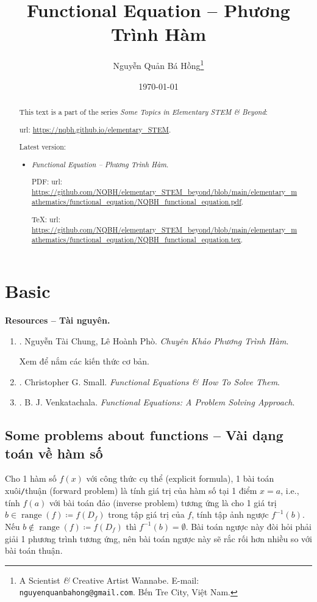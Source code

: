 \documentclass{article}
\title{Functional Equation -- Phương Trình Hàm}
\author{Nguyễn Quản Bá Hồng\footnote{A Scientist {\it\&} Creative Artist Wannabe. E-mail: {\tt nguyenquanbahong@gmail.com}. Bến Tre City, Việt Nam.}}
\date{\today}
\begin{document}
\maketitle
\begin{abstract}
	This text is a part of the series {\it Some Topics in Elementary STEM \& Beyond}:
	
	{\sc url}: \url{https://nqbh.github.io/elementary_STEM}.
	
	Latest version:
	\begin{itemize}
		\item {\it Functional Equation -- Phương Trình Hàm}.
		
		PDF: {\sc url}: \url{https://github.com/NQBH/elementary_STEM_beyond/blob/main/elementary_mathematics/functional_equation/NQBH_functional_equation.pdf}.
		
		\TeX: {\sc url}: \url{https://github.com/NQBH/elementary_STEM_beyond/blob/main/elementary_mathematics/functional_equation/NQBH_functional_equation.tex}.
	\end{itemize}
\end{abstract}
\tableofcontents


\section{Basic}
\textbf{\textsf{Resources -- Tài nguyên.}}
\begin{enumerate}
	\item \cite{Chung_Pho_pth}. {\sc Nguyễn Tài Chung, Lê Hoành Phò}. {\it Chuyên Khảo Phương Trình Hàm}.
	
	Xem \cite[Chap. 1, Sect. 1.1: {\it 1 số kiến thức về hàm số \& ánh xạ}]{Chung_Pho_pth} để nắm các kiến thức cơ bản.
	\item \cite{Small2007}. {\sc Christopher G. Small}. {\it Functional Equations \& How To Solve Them}.	
	\item \cite{Venkatachala2013}. {\sc B. J. Venkatachala}. {\it Functional Equations: A Problem Solving Approach}.
\end{enumerate}

\subsection{Some problems about functions -- Vài dạng toán về hàm số}
Cho 1 hàm số $f(x)$ với công thức cụ thể (explicit formula), 1 bài toán xuôi{\tt/}thuận (forward problem) là tính giá trị của hàm số tại 1 điểm $x = a$, i.e., tính $f(a)$ với bài toán đảo (inverse problem) tương ứng là cho 1 giá trị $b\in\operatorname{range}(f)\coloneqq f(D_f)$ trong tập giá trị của $f$, tính tập ảnh ngược $f^{-1}(b)$. Nếu $b\notin\operatorname{range}(f)\coloneqq f(D_f)$ thì $f^{-1}(b) = \emptyset$. Bài toán ngược này đòi hỏi phải giải 1 phương trình tương ứng, nên bài toán ngược này sẽ rắc rối hơn nhiều so với bài toán thuận.
\end{document}
